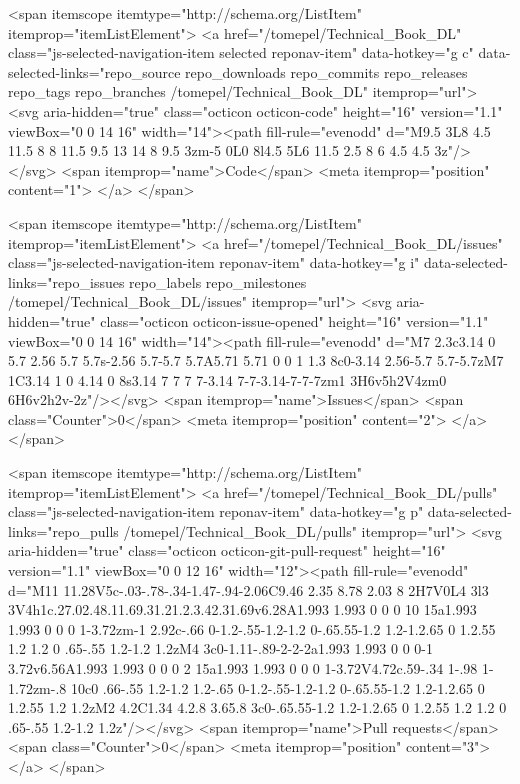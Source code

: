   <span itemscope itemtype="http://schema.org/ListItem" itemprop="itemListElement">
    <a href="/tomepel/Technical_Book_DL" class="js-selected-navigation-item selected reponav-item" data-hotkey="g c" data-selected-links="repo_source repo_downloads repo_commits repo_releases repo_tags repo_branches /tomepel/Technical_Book_DL" itemprop="url">
      <svg aria-hidden="true" class="octicon octicon-code" height="16" version="1.1" viewBox="0 0 14 16" width="14"><path fill-rule="evenodd" d="M9.5 3L8 4.5 11.5 8 8 11.5 9.5 13 14 8 9.5 3zm-5 0L0 8l4.5 5L6 11.5 2.5 8 6 4.5 4.5 3z"/></svg>
      <span itemprop="name">Code</span>
      <meta itemprop="position" content="1">
</a>  </span>

    <span itemscope itemtype="http://schema.org/ListItem" itemprop="itemListElement">
      <a href="/tomepel/Technical_Book_DL/issues" class="js-selected-navigation-item reponav-item" data-hotkey="g i" data-selected-links="repo_issues repo_labels repo_milestones /tomepel/Technical_Book_DL/issues" itemprop="url">
        <svg aria-hidden="true" class="octicon octicon-issue-opened" height="16" version="1.1" viewBox="0 0 14 16" width="14"><path fill-rule="evenodd" d="M7 2.3c3.14 0 5.7 2.56 5.7 5.7s-2.56 5.7-5.7 5.7A5.71 5.71 0 0 1 1.3 8c0-3.14 2.56-5.7 5.7-5.7zM7 1C3.14 1 0 4.14 0 8s3.14 7 7 7 7-3.14 7-7-3.14-7-7-7zm1 3H6v5h2V4zm0 6H6v2h2v-2z"/></svg>
        <span itemprop="name">Issues</span>
        <span class="Counter">0</span>
        <meta itemprop="position" content="2">
</a>    </span>

  <span itemscope itemtype="http://schema.org/ListItem" itemprop="itemListElement">
    <a href="/tomepel/Technical_Book_DL/pulls" class="js-selected-navigation-item reponav-item" data-hotkey="g p" data-selected-links="repo_pulls /tomepel/Technical_Book_DL/pulls" itemprop="url">
      <svg aria-hidden="true" class="octicon octicon-git-pull-request" height="16" version="1.1" viewBox="0 0 12 16" width="12"><path fill-rule="evenodd" d="M11 11.28V5c-.03-.78-.34-1.47-.94-2.06C9.46 2.35 8.78 2.03 8 2H7V0L4 3l3 3V4h1c.27.02.48.11.69.31.21.2.3.42.31.69v6.28A1.993 1.993 0 0 0 10 15a1.993 1.993 0 0 0 1-3.72zm-1 2.92c-.66 0-1.2-.55-1.2-1.2 0-.65.55-1.2 1.2-1.2.65 0 1.2.55 1.2 1.2 0 .65-.55 1.2-1.2 1.2zM4 3c0-1.11-.89-2-2-2a1.993 1.993 0 0 0-1 3.72v6.56A1.993 1.993 0 0 0 2 15a1.993 1.993 0 0 0 1-3.72V4.72c.59-.34 1-.98 1-1.72zm-.8 10c0 .66-.55 1.2-1.2 1.2-.65 0-1.2-.55-1.2-1.2 0-.65.55-1.2 1.2-1.2.65 0 1.2.55 1.2 1.2zM2 4.2C1.34 4.2.8 3.65.8 3c0-.65.55-1.2 1.2-1.2.65 0 1.2.55 1.2 1.2 0 .65-.55 1.2-1.2 1.2z"/></svg>
      <span itemprop="name">Pull requests</span>
      <span class="Counter">0</span>
      <meta itemprop="position" content="3">
</a>  </span>

